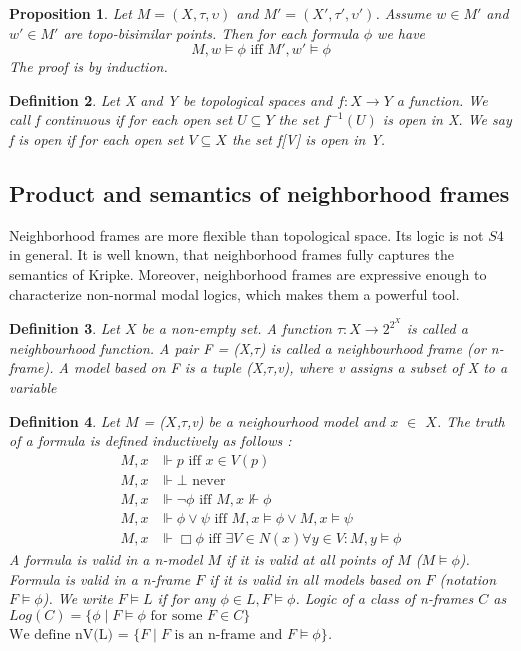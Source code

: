 \documentclass[12pt, a4paper]{scrartcl}
\newtheorem{definition}{Definition}[subsection]
\newtheorem{proposition}[definition]{Proposition}
\begin{document}
\begin{proposition}
    Let $M = (X,\tau, \upsilon)$ and $M' = (X', \tau', \upsilon')$. Assume $w \in M'$ and $w' \in M'$ are topo-bisimilar points.
    Then for each formula $\phi$ we have 
    $$M,w \vDash \phi \mbox{ iff } M', w' \vDash \phi$$
    The proof is by induction.

\end{proposition}


\begin{definition}
    Let X and Y be topological spaces and $f : X \rightarrow Y$ a function.
    We call f continuous if for each open set $U \subseteq Y$ the set $f^{-1}(U)$ is open in X. We say f 
    is open if for each open set $V \subseteq X$ the set f[V] is open in Y.
        
\end{definition}

\subsection{Product and semantics of neighborhood frames}
Neighborhood frames are more flexible than topological space. Its logic is not $S4$ in general. 
It is well known, that neighborhood frames fully captures the semantics of Kripke. Moreover, neighborhood frames are expressive enough to characterize non-normal modal logics, which makes them a powerful tool.


\begin{definition}
    Let $X$ be a non-empty set. A function  $\tau : X \rightarrow 2^{2^X}$ is called a neighbourhood function. A pair 
    F = (X,$\tau$) is called a neighbourhood frame (or n-frame). A model based on F is a tuple (X,$\tau$,v), where v assigns a subset of X to a variable
        
\end{definition}

\begin{definition}
    Let $M$ = ($X$,$\tau$,v) be a neighourhood model and $x$ $\in$ $X$. The truth of a formula is defined inductively as follows :
    \begin{align*}
        M,x &\Vdash p \mbox{ iff } x \in V(p)\\
        M,x &\Vdash \bot \mbox{ never } \\
        M,x &\Vdash \neg \phi \mbox{ iff } M,x \nVdash \phi\\
        M,x &\Vdash \phi \lor \psi \mbox{ iff } M,x \vDash \phi \lor M,x \vDash \psi\\
        M,x &\Vdash \Box \phi \mbox{ iff } \exists V \in N(x) \forall y \in V : M,y \models \phi
    \end{align*}
    A formula is valid in a n-model $M$ if it is valid at all points of $M$ ($M \vDash \phi$). Formula is valid in a n-frame $F$ if it is valid in
    all models based on $F$ (notation $F \vDash \phi$). We write $F \vDash L$ if for any $\phi \in L, F \vDash \phi$. Logic of a class of n-frames $C$ as $Log(C) = \{\phi \mid F \vDash \phi \mbox{ for some } F \in C\}$
    $\mbox{We define nV(L) =  } \{ F \mid F \mbox{ is an n-frame and } F \models \phi \}$.
\end{definition}
\end{document}
